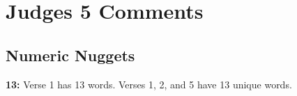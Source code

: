 \section{Judges 5 Comments}

\subsection{Numeric Nuggets}
\textbf{13: } Verse 1 has 13 words. Verses 1, 2, and 5 have 13 unique words.